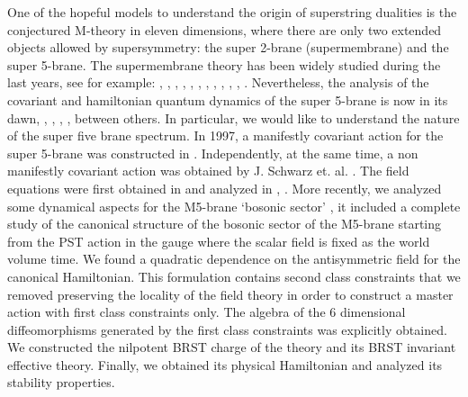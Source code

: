 \documentclass[a4paper,12pt]{article}
\begin{document}
One of the hopeful models to understand the origin of superstring
 dualities is the conjectured M-theory in eleven dimensions,
 where there are only two extended objects
allowed by  supersymmetry: the super 2-brane (supermembrane) and
the super 5-brane. The supermembrane theory has  been widely
studied during the last years, see for example:
\cite{Nicolai:1998ic},  \cite{deWit:1987iw}, \cite{deWit:1988ig},
\cite{deWit:1989ct}, \cite{hopetesis}, \cite{Bergshoeff:1988in},
\cite{Bergshoeff:1987dh}, \cite{Bergshoeff:1987cm},
\cite{Duff:1988cs}, \cite{deWit:1990vb},
\cite{GarciadelMoral:2001zb}, \cite{Boulton:2001gz}. Nevertheless,
the analysis of the covariant and hamiltonian quantum dynamics of
the super 5-brane is now in its dawn, \cite{Pasti2}, \cite{JS3},
\cite{townsendund} \cite{lamamiaqui}, \cite{DeCastro:2001gp},
between others. In particular, we would like to understand the
nature of the super five brane spectrum. In 1997, a manifestly
covariant action for the super 5-brane was constructed  in
\cite{Pasti2}. Independently, at the same time, a non manifestly
covariant action was obtained by J. Schwarz et. al. \cite{JS3}.
The field equations were first obtained in \cite{Howe:1997yn} and
analyzed in \cite{Howe:1997fb}, \cite{Bergshoeff:1998vx}. More
recently, we analyzed some dynamical aspects for the M5-brane
`bosonic sector' \cite{lamamiaqui}\cite{DeCastro:2001gp}, it
included a complete study of the canonical structure of the
bosonic sector of the M5-brane starting from the PST action in the
gauge where the scalar field is fixed as the world volume time. We
found a quadratic dependence on the antisymmetric field for the
canonical Hamiltonian. This formulation contains second class
constraints that we removed preserving the locality of the field
theory in order to construct a master action with first class
constraints only. The  algebra of the 6 dimensional
diffeomorphisms generated by the first class constraints was
explicitly obtained.  We constructed the nilpotent BRST charge of
the theory and its BRST invariant effective theory. Finally, we
obtained its physical Hamiltonian and analyzed its stability
properties.
\end{document}
